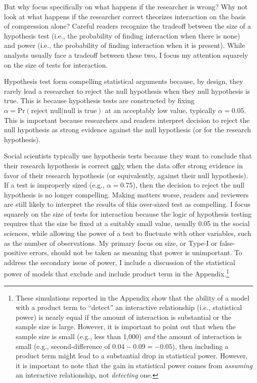 \documentclass[12pt]{article}
\begin{document}
But why focus specifically on what happens if the researcher is wrong? Why not look at what happens if the researcher correct theorizes interaction on the basis of compression alone? Careful readers recognize the tradeoff between the size of a hypothesis test (i.e., the probability of finding interaction when there is none) and power (i.e., the probability of finding interaction when it is present). While analysts usually face a tradeoff between these two, I focus my attention squarely on the size of tests for interaction.

Hypothesis test form compelling statistical arguments because, by design, they rarely lead a researcher to reject the null hypothesis when they null hypothesis is true. This is because hypothesis tests are constructed by fixing $\alpha = \text{Pr}(\text{reject null} | \text{null is true})$  at an acceptably low value, typically $\alpha = 0.05$. This is important because researchers and readers interpret decision to reject the null hypothesis as strong evidence against the null hypothesis (or for the research hypothesis).

Social scientists typically use hypothesis tests because they want to conclude that their research hypothesis is correct \underline{only} when the data offer strong evidence in favor of their research hypothesis (or equivalently, against their null hypothesis). If a test is improperly sized (e.g., $\alpha = 0.75$), then the decision to reject the null hypothesis is no longer compelling. Making matters worse, readers and reviewers are still likely to interpret the results of this over-sized test as compelling. I focus squarely on the size of tests for interaction because the logic of hypothesis testing requires that the size be fixed at a suitably small value, usually 0.05 in the social sciences, while allowing the power of a test to fluctuate with other variables, such as the number of observations. My primary focus on size, or Type-I or false-positive errors, should not be taken as meaning that power is unimportant. To address the secondary issue of power, I include a discussion of the statistical power of models that exclude and include product term in the Appendix.\footnote{These simulations reported in the Appendix show that the ability of a model with a product term to ``detect'' an interactive relationship (i.e., statistical power) is nearly equal if the amount of interaction is substantial or the sample size is large. However, it is important to point out that when the sample size is small (e.g., less than 1,000) \textit{and} the amount of interaction is small (e.g., second-difference of $0.04 - 0.09 = -0.05$), then including a product term might lead to a substantial drop in statistical power. However, it is important to note that the gain in statistical power comes from \textit{assuming} an interactive relationship, not \textit{detecting} one.} 
\end{document}
